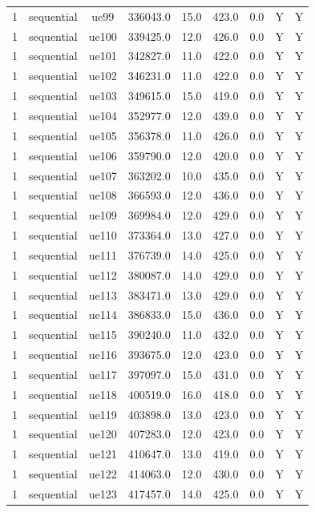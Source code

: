 \begin{table}[ht]
\begin{tabular}{|c|c|c|c|c|c|c|c|c|}
1 & sequential & ue99 & 336043.0 & 15.0 & 423.0 & 0.0 & Y & Y \\
1 & sequential & ue100 & 339425.0 & 12.0 & 426.0 & 0.0 & Y & Y \\
1 & sequential & ue101 & 342827.0 & 11.0 & 422.0 & 0.0 & Y & Y \\
1 & sequential & ue102 & 346231.0 & 11.0 & 422.0 & 0.0 & Y & Y \\
1 & sequential & ue103 & 349615.0 & 15.0 & 419.0 & 0.0 & Y & Y \\
1 & sequential & ue104 & 352977.0 & 12.0 & 439.0 & 0.0 & Y & Y \\
1 & sequential & ue105 & 356378.0 & 11.0 & 426.0 & 0.0 & Y & Y \\
1 & sequential & ue106 & 359790.0 & 12.0 & 420.0 & 0.0 & Y & Y \\
1 & sequential & ue107 & 363202.0 & 10.0 & 435.0 & 0.0 & Y & Y \\
1 & sequential & ue108 & 366593.0 & 12.0 & 436.0 & 0.0 & Y & Y \\
1 & sequential & ue109 & 369984.0 & 12.0 & 429.0 & 0.0 & Y & Y \\
1 & sequential & ue110 & 373364.0 & 13.0 & 427.0 & 0.0 & Y & Y \\
1 & sequential & ue111 & 376739.0 & 14.0 & 425.0 & 0.0 & Y & Y \\
1 & sequential & ue112 & 380087.0 & 14.0 & 429.0 & 0.0 & Y & Y \\
1 & sequential & ue113 & 383471.0 & 13.0 & 429.0 & 0.0 & Y & Y \\
1 & sequential & ue114 & 386833.0 & 15.0 & 436.0 & 0.0 & Y & Y \\
1 & sequential & ue115 & 390240.0 & 11.0 & 432.0 & 0.0 & Y & Y \\
1 & sequential & ue116 & 393675.0 & 12.0 & 423.0 & 0.0 & Y & Y \\
1 & sequential & ue117 & 397097.0 & 15.0 & 431.0 & 0.0 & Y & Y \\
1 & sequential & ue118 & 400519.0 & 16.0 & 418.0 & 0.0 & Y & Y \\
1 & sequential & ue119 & 403898.0 & 13.0 & 423.0 & 0.0 & Y & Y \\
1 & sequential & ue120 & 407283.0 & 12.0 & 423.0 & 0.0 & Y & Y \\
1 & sequential & ue121 & 410647.0 & 13.0 & 419.0 & 0.0 & Y & Y \\
1 & sequential & ue122 & 414063.0 & 12.0 & 430.0 & 0.0 & Y & Y \\
1 & sequential & ue123 & 417457.0 & 14.0 & 425.0 & 0.0 & Y & Y \\

\end{tabular}
\end{table}
